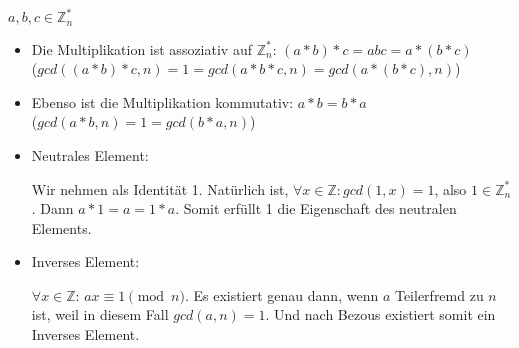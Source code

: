 \documentclass[12pt,pdftex,a4paper]{article}
\begin{document}
~\\
$ a, b, c \in  \mathds{Z}^*_n $
\begin{itemize}
	\item Die Multiplikation ist assoziativ auf $ \mathds{Z}^*_n $:
	$ ( a * b ) * c =abc= a * ( b * c) $\\
	($ gcd((a*b)*c, n) = 1 = gcd(a*b*c, n) = gcd(a*(b*c), n) $)
	
	
	
	\item Ebenso ist die Multiplikation kommutativ: $ a*b = b*a $\\
	($ gcd(a*b, n) = 1 = gcd(b*a, n) $)
	
	
	
	\item Neutrales Element:
	
	Wir nehmen als Identität 1. Natürlich ist, $ \forall x \in  \mathds{Z} : gcd(1, x) = 1 $, also $ 1 \in \mathds{Z}^*_n $. Dann $ a * 1 = a = 1 * a $. Somit erfüllt 1 die Eigenschaft des neutralen Elements.
	
	
	
	\item Inverses Element: %
	
	$ \forall x \in  \mathds{Z} $: 
	$ ax \equiv 1 \pmod{n} $. Es existiert genau dann, wenn $ a $ Teilerfremd zu $ n $ ist, weil in diesem Fall $ gcd(a, n) = 1 $. Und nach Bezous existiert somit ein Inverses Element.
	 
\end{itemize}
\end{document}
